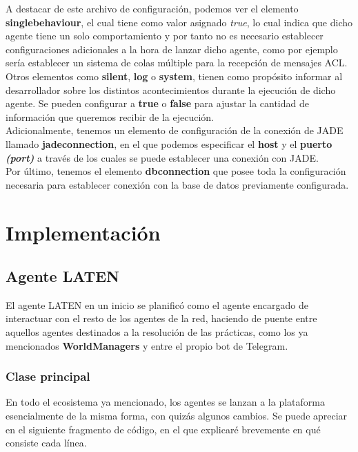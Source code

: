 A destacar de este archivo de configuración, podemos ver el elemento \textbf{singlebehaviour}, el cual tiene como valor asignado \textit{true}, lo cual indica que dicho agente tiene un solo comportamiento y por tanto no es necesario establecer configuraciones adicionales a la hora de lanzar dicho agente, como por ejemplo sería establecer un sistema de colas múltiple para la recepción de mensajes ACL.\\

Otros elementos como \textbf{silent}, \textbf{log} o \textbf{system}, tienen como propósito informar al desarrollador sobre los distintos acontecimientos durante la ejecución de dicho agente. Se pueden configurar a \textbf{true} o \textbf{false} para ajustar la cantidad de información que queremos recibir de la ejecución.\\

Adicionalmente, tenemos un elemento de configuración de la conexión de JADE llamado \textbf{jadeconnection}, en el que podemos especificar el \textbf{host} y el \textbf{puerto \textit{(port)}} a través de los cuales se puede establecer una conexión con JADE.\\

Por último, tenemos el elemento \textbf{dbconnection} que posee toda la configuración necesaria para establecer conexión con la base de datos previamente configurada.

\section{Implementación}

\subsection{Agente LATEN}

El agente LATEN en un inicio se planificó como el agente encargado de interactuar con el resto de los agentes de la red, haciendo de puente entre aquellos agentes destinados a la resolución de las prácticas, como los ya mencionados \textbf{WorldManagers} y entre el propio bot de Telegram.

\subsubsection{Clase principal}

En todo el ecosistema ya mencionado, los agentes se lanzan a la plataforma esencialmente de la misma forma, con quizás algunos cambios. Se puede apreciar en el siguiente fragmento de código, en el que explicaré brevemente en qué consiste cada línea.

